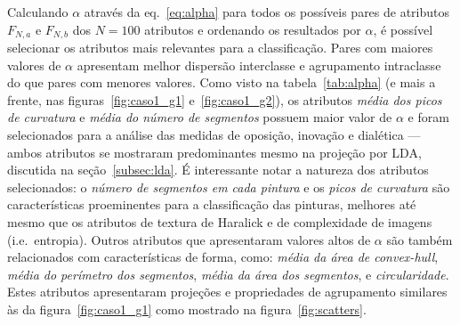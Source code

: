 Calculando $\alpha$ através da eq.~\ref{eq:alpha} para todos os
possíveis pares de atributos $F_{N, a}$ e $F_{N, b}$ dos $N = 100$
atributos e ordenando os resultados por $\alpha$, é possível
selecionar os atributos mais relevantes para a classificação.
Pares com maiores valores de $\alpha$ apresentam melhor dispersão
interclasse e agrupamento intraclasse do que pares com menores
valores. Como visto na tabela~\ref{tab:alpha} (e mais a frente, nas
figuras~\ref{fig:caso1_g1} e~\ref{fig:caso1_g2}), os atributos
\emph{média dos picos de curvatura} e \emph{média do número de
  segmentos} possuem maior valor de $\alpha$ e foram selecionados para
a análise das medidas de oposição, inovação e dialética --- ambos
atributos se mostraram predominantes mesmo na projeção por LDA,
discutida na seção~\ref{subsec:lda}. É interessante notar a natureza
dos atributos selecionados: o \textit{número de segmentos em cada pintura} e os
\textit{picos de curvatura} são características proeminentes para a
classificação das pinturas, melhores até mesmo que os atributos de
textura de Haralick e de complexidade de imagens (i.e.\
entropia). Outros atributos que apresentaram valores altos de $\alpha$
são também relacionados com características de forma, como:
\textit{média da área de convex-hull}, \textit{média do perímetro dos segmentos}, \textit{média da área dos segmentos}, e \textit{circularidade}. Estes atributos apresentaram projeções e
propriedades de agrupamento similares às da figura~\ref{fig:caso1_g1}
como mostrado na figura~\ref{fig:scatters}.
 
